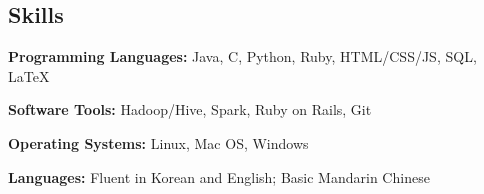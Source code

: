 \documentclass[10pt,margin,line]{cv}
\begin{document}
\begin{resume}
    \section{\mysidestyle Skills}
    \begin{list3}
    \item\textbf{Programming Languages:} Java, C, Python, Ruby, HTML/CSS/JS, SQL, \LaTeX
    \item\textbf{Software Tools:}  Hadoop/Hive, Spark, Ruby on Rails, Git
    \item\textbf{Operating Systems:} Linux, Mac OS, Windows
    \item\textbf{Languages:} Fluent in Korean and English; Basic Mandarin Chinese
    \end{list3}

\end{resume}
\end{document}
